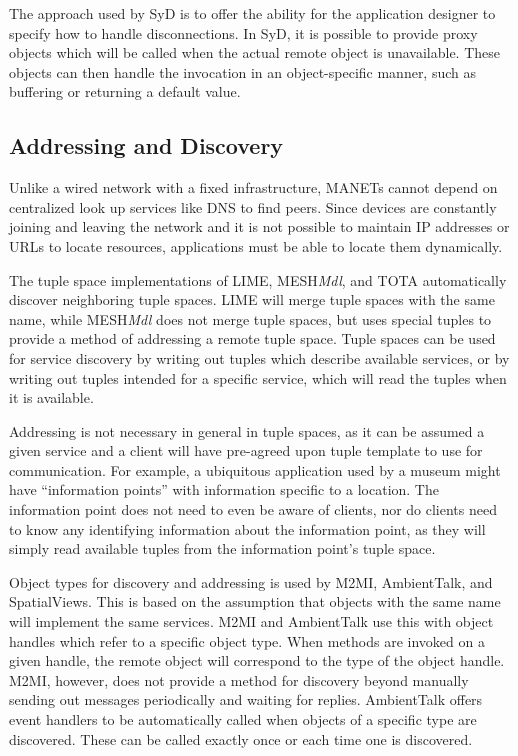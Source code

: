 \documentclass{sig-alternate}
\begin{document}
The approach used by SyD is to offer the ability for the application designer to specify how to handle disconnections. In SyD, it is possible to provide proxy objects which will be called when the actual remote object is unavailable. These objects can then handle the invocation in an object-specific manner, such as buffering or returning a default value. \begin{comment}YCab provides an interface for storing application-specific data and restoring the state of the application upon reconnection to a given session.\end{comment}

\subsection{Addressing and Discovery}

Unlike a wired network with a fixed infrastructure, MANETs cannot depend on centralized look up services like DNS to find peers. Since devices are constantly joining and leaving the network and it is not possible to maintain IP addresses or URLs to locate resources, applications must be able to locate them dynamically.

The tuple space implementations of LIME, MESH\textit{Mdl}, and TOTA automatically discover neighboring tuple spaces. LIME will merge tuple spaces with the same name, while MESH\textit{Mdl} does not merge tuple spaces, but uses special tuples to provide a method of addressing a remote tuple space. Tuple spaces can be used for service discovery by writing out tuples which describe available services, or by writing out tuples intended for a specific service, which will read the tuples when it is available.

Addressing is not necessary in general in tuple spaces, as it can be assumed a given service and a client will have pre-agreed upon tuple template to use for communication. For example, a ubiquitous application used by a museum might have ``information points'' with information specific to a location. The information point does not need to even be aware of clients, nor do clients need to know any identifying information about the information point, as they will simply read available tuples from the information point's tuple space.

Object types for discovery and addressing is used by M2MI, AmbientTalk, and SpatialViews. This is based on the assumption that objects with the same name will implement the same services. M2MI and AmbientTalk use this with object handles which refer to a specific object type. When methods are invoked on a given handle, the remote object will correspond to the type of the object handle. M2MI, however, does not provide a method for discovery beyond manually sending out messages periodically and waiting for replies. AmbientTalk offers event handlers to be automatically called when objects of a specific type are discovered. These can be called exactly once or each time one is discovered.
\end{document}
